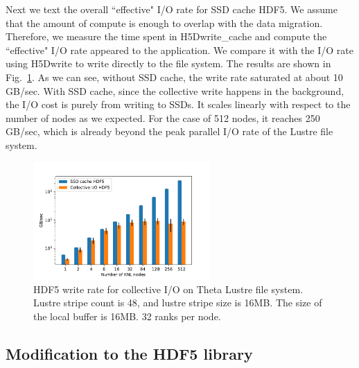 \documentclass[aps, rmp, 11pt, notitlepage]{revtex4-1}
\begin{document}
Next we text the overall ``effective" I/O rate for SSD cache HDF5. We assume that the amount of compute is enough to overlap with the data migration. Therefore, we measure the time spent in H5Dwrite\_cache and compute the ``effective" I/O rate appeared to the application. We compare it with the I/O rate using H5Dwrite to write directly to the file system. The results are shown in Fig.~\ref{fig:perf}.
 As we can see, without SSD cache, the write rate saturated at about 10 GB/sec. With SSD cache, since the collective write happens in the background, the I/O cost is purely from writing to SSDs. It scales linearly with respect to the number of nodes as we expected. For the case of 512 nodes, it reaches 250 GB/sec, which is already beyond the peak parallel I/O rate of the Lustre file system. 
\label{sec:perf}
\begin{figure}[hbt]
\centering
\includegraphics[width=0.6\textwidth]{ssd_cache.pdf}
\caption{HDF5 write rate for collective I/O on Theta Lustre file system. Lustre stripe count is 48, and lustre stripe size is 16MB. The size of the local buffer is 16MB. 32 ranks per node.}\label{fig:perf}
\end{figure}


\subsection{Modification to the HDF5 library}
\end{document}
